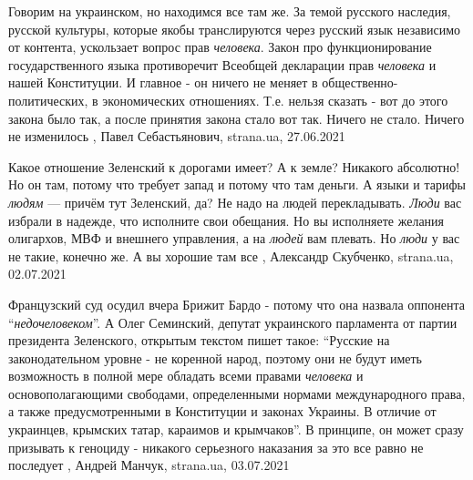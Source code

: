 Говорим на украинском, но находимся все там же.  За темой русского наследия,
русской культуры, которые якобы транслируются через русский язык независимо от
контента, ускользает вопрос прав \emph{человека}.  Закон про функционирование
государственного языка противоречит Всеобщей декларации прав \emph{человека} и нашей
Конституции. И главное - он ничего не меняет в общественно-политических, в
экономических отношениях. Т.е. нельзя сказать - вот до этого закона было так, а
после принятия закона стало вот так. Ничего не стало. Ничего не изменилось
, 
Павел Себастьянович, strana.ua, 27.06.2021

Какое отношение Зеленский к дорогами имеет? А к земле? Никакого абсолютно! Но
он там, потому что требует запад и потому что там деньги. А языки и тарифы
\emph{людям} — причём тут Зеленский, да?  Не надо на людей перекладывать.
\emph{Люди} вас избрали в надежде, что исполните свои обещания. Но вы
исполняете желания олигархов, МВФ и внешнего управления, а на \emph{людей} вам
плевать. Но \emph{люди} у вас не такие, конечно же. А вы хорошие там все
, 
Александр Скубченко, strana.ua, 02.07.2021

Французский суд осудил вчера Брижит Бардо - потому что она назвала оппонента
\enquote{\emph{недочеловеком}}. А Олег Семинский, депутат украинского парламента от
партии президента Зеленского, открытым текстом пишет такое:
\enquote{Русские на законодательном уровне - не коренной народ, поэтому они не будут
иметь возможность в полной мере обладать всеми правами \emph{человека} и
основополагающими свободами, определенными нормами международного права, а
также предусмотренными в Конституции и законах Украины. В отличие от украинцев,
крымских татар, караимов и крымчаков}.
В принципе, он может сразу призывать к геноциду - никакого серьезного наказания
за это все равно не последует
, Андрей Манчук, strana.ua, 03.07.2021

